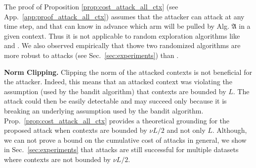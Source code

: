 The proof of Proposition \ref{prop:cost_attack_all_ctx} (see App.~\ref{app:proof_attack_all_ctx}) assumes that the attacker can attack at any time step, and that  can know in advance which arm will be pulled by Alg. $\mathfrak{A}$ in a given context. Thus it is not applicable to random exploration algorithms like \lints \cite{agrawal2013thompson} and \epsgreedy.  We also observed empirically that thowe two randomized algorithms are more robust to attacks (see Sec.~\ref{sec:experiments}) than \linucb.

\textbf{Norm Clipping.} Clipping the norm of the attacked contexts is not beneficial for the attacker. Indeed, this means that an attacked context was violating the assumption (used by the bandit algorithm) that contexts are bounded by $L$. The attack could then be easily detectable and may succeed only because it is breaking an underlying assumption used by the bandit algorithm. Prop.~\ref{prop:cost_attack_all_ctx} provides a theoretical grounding for the proposed attack when contexts are bounded by $\nu L/2$ and not only $L$.
Although, we can not prove a bound on the cumulative cost of attacks in general, we show in Sec.~\ref{sec:experiments} that attacks are still successful for multiple datasets where contexts are not bounded by $\nu L/2$. 



  

